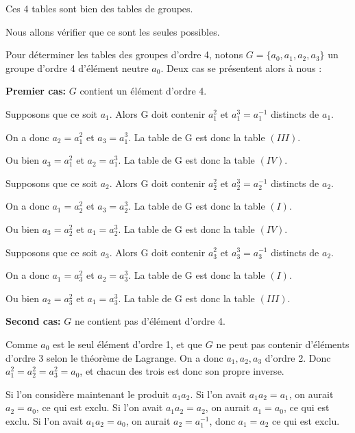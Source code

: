\documentclass[titlepage]{article}
\begin{document}
    Ces 4 tables sont bien des tables de groupes.\newline

    Nous allons vérifier que ce sont les seules possibles.
    
    Pour déterminer les tables des groupes d'ordre 4, notons $G = \{a_0, a_1, a_2, a_3\}$ un groupe d'ordre 4 d'élément neutre $a_0$.
    Deux cas se présentent alors à nous :\newline

    \textbf{Premier cas:} $G$ contient un élément d'ordre 4.\newline
    
    Supposons que ce soit $a_1$. Alors G doit contenir $a_1^2$ et $a_1^3 = a_1^{-1}$ distincts de $a_1$.
    
    On a donc $a_2 = a_1^2$ et $a_3 = a_1^3$. La table de G est donc la table $(III)$.
    
    Ou bien $a_3 = a_1^2$ et $a_2 = a_1^3$. La table de G est donc la table $(IV)$.\newline

    Supposons que ce soit $a_2$. Alors G doit contenir $a_2^2$ et $a_2^3 = a_2^{-1}$ distincts de $a_2$.
    
    On a donc $a_1 = a_2^2$ et $a_3 = a_2^3$. La table de G est donc la table $(I)$.
    
    Ou bien $a_3 = a_2^2$ et $a_1 = a_2^3$. La table de G est donc la table $(IV)$.\newline

    Supposons que ce soit $a_3$. Alors G doit contenir $a_3^2$ et $a_3^3 = a_3^{-1}$ distincts de $a_2$.
    
    On a donc $a_1 = a_3^2$ et $a_2 = a_3^3$. La table de G est donc la table $(I)$.
    
    Ou bien $a_2 = a_3^2$ et $a_1 = a_3^3$. La table de G est donc la table $(III)$.\newline

    \textbf{Second cas:} $G$ ne contient pas d'élément d'ordre 4. \newline
    
    Comme $a_0$ est le seul élément d'ordre 1, 
    et que $G$ ne peut pas contenir d'éléments d'ordre 3 selon le théorème de Lagrange. 
    On a donc $a_1, a_2, a_3$ d'ordre 2.
    Donc $a_1^2 = a_2^2 = a_3^2 = a_0$, et chacun des trois est donc son propre inverse.\newline
    
    Si l'on considère maintenant le produit $a_1a_2$. Si l'on avait $a_1a_2 = a_1$, on aurait $a_2 = a_0$, ce qui est exclu.
    Si l'on avait $a_1a_2 = a_2$, on aurait $a_1 = a_0$, ce qui est exclu. Si l'on avait $a_1a_2 = a_0$, on aurait $a_2 = a_1^{-1}$, donc $a_1 = a_2$ ce qui est exclu.\newline
    
\end{document}
